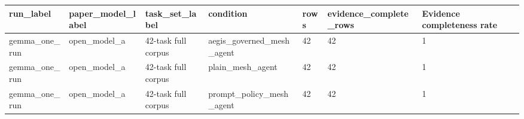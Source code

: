\begin{tabular}{lllllll}
 \hline
run\_label & paper\_model\_label & task\_set\_label & condition & rows & evidence\_complete\_rows & Evidence completeness rate \\
 \hline
gemma\_one\_run & open\_model\_a & 42-task full corpus & aegis\_governed\_mesh\_agent & 42 & 42 & 1 \\
gemma\_one\_run & open\_model\_a & 42-task full corpus & plain\_mesh\_agent & 42 & 42 & 1 \\
gemma\_one\_run & open\_model\_a & 42-task full corpus & prompt\_policy\_mesh\_agent & 42 & 42 & 1 \\
 \hline
\end{tabular}
